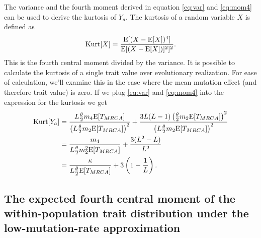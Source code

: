 The variance and the fourth moment derived in equation \eqref{eq:var} and
\eqref{eq:mom4} can be used to derive the kurtosis of $Y_a$. The kurtosis of a
random variable $X$ is defined as
\begin{equation*}
  \mathrm{Kurt}[X]=\frac{\mathrm{E}[(X-\mathrm{E}[X])^4]}{\mathrm{E}[(X-\mathrm{E}[X])]^2]^2}.
\end{equation*}
This is the fourth central moment divided by the variance. It is possible to
calculate the kurtosis of a single trait value over evolutionary realization.
For ease of calculation, we'll examine this in the case where the mean mutation
effect (and therefore trait value) is zero. If we plug \eqref{eq:var} and
\eqref{eq:mom4} into the expression for the kurtosis we get
\begin{align*}
  \mathrm{Kurt}[Y_a] &= \frac{L\frac{\theta}{2} m_4 \mathrm{E}[T_{MRCA}]}{\left(L\frac{\theta}{2} m_2 \mathrm{E}[T_{MRCA}]\right)^2} +
  \frac{3L(L-1)\left( \frac{\theta}{2} m_2  \mathrm{E}[T_{MRCA}]\right)^2}{\left(L\frac{\theta}{2} m_2 \mathrm{E}[T_{MRCA}]\right)^2} \nonumber \\
  &= \frac{m_4}{L\frac{\theta}{2} m_2^2\mathrm{E}[T_{MRCA}]} + \frac{3(L^2-L)}{L^2} \nonumber \\
  &= \frac{\kappa}{L\frac{\theta}{2} \mathrm{E}[T_{MRCA}]} + 3\left( 1 - \frac{1}{L} \right).
\end{align*}

\subsection*{The expected fourth central moment of the within-population trait distribution under the low-mutation-rate approximation }

